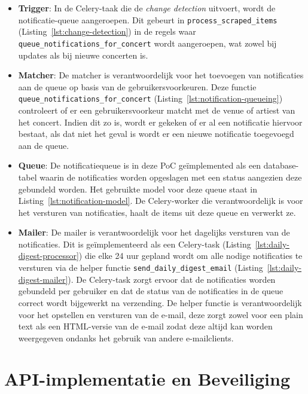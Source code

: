 \begin{itemize}
    \item \textbf{Trigger}: In de Celery-taak die de \textit{change detection} uitvoert, wordt de notificatie-queue aangeroepen.
                            Dit gebeurt in \texttt{process\_scraped\_items} (Listing~\ref{lst:change-detection}) in de regels waar \texttt{queue\_notifications\_for\_concert} wordt aangeroepen, wat zowel bij updates als bij nieuwe concerten is.
    \item \textbf{Matcher}: De matcher is verantwoordelijk voor het toevoegen van notificaties aan de queue op basis van de gebruikersvoorkeuren. 
                            Deze functie \newline \texttt{queue\_notifications\_for\_concert} (Listing~\ref{lst:notification-queueing}) controleert of er een gebruikersvoorkeur matcht met de venue of artiest van het concert.
                            Indien dit zo is, wordt er gekeken of er al een notificatie hiervoor bestaat, als dat niet het geval is wordt er een nieuwe notificatie toegevoegd aan de queue. 
    \item \textbf{Queue}: De notificatiequeue is in deze \gls{PoC} geïmplemented als een database-tabel waarin de notificaties worden opgeslagen met een status aangezien deze gebundeld worden. Het gebruikte model voor deze queue staat in Listing~\ref{lst:notification-model}.
                          De Celery-worker die verantwoordelijk is voor het versturen van notificaties, haalt de items uit deze queue en verwerkt ze.
    \item \textbf{Mailer}: De mailer is verantwoordelijk voor het dagelijks versturen van de notificaties. Dit is geïmplementeerd als een Celery-task (Listing~\ref{lst:daily-digest-processor}) die elke 24 uur gepland wordt om alle nodige notificaties te versturen via de helper functie \texttt{send\_daily\_digest\_email} (Listing~\ref{lst:daily-digest-mailer}).
                            De Celery-task zorgt ervoor dat de notificaties worden gebundeld per gebruiker en dat de status van de notificaties in de queue correct wordt bijgewerkt na verzending. De helper functie is verantwoordelijk voor het opstellen en versturen van de e-mail, deze zorgt zowel voor een plain text als een HTML-versie van de e-mail zodat deze altijd kan worden weergegeven ondanks het gebruik van andere e-mailclients.
\end{itemize}

\section{API-implementatie en Beveiliging}

